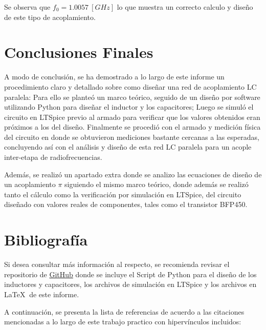 \documentclass[conference]{IEEEtran}
\begin{document}
Se observa que $f_{0} = 1.0057 \ [GHz]$ lo que muestra un correcto calculo y diseño de este tipo de acoplamiento.



\section{Conclusiones Finales}
A modo de conclusión, se ha demostrado a lo largo de este informe un procedimiento claro y detallado sobre como diseñar una red de acoplamiento LC paralela: Para ello se planteó un marco teórico, seguido de un diseño por software utilizando Python para diseñar el inductor y los capacitores; Luego se simuló el circuito en LTSpice previo al armado para verificar que los valores obtenidos eran próximos a los del diseño. Finalmente se procedió con el armado y medición física del circuito en donde se obtuvieron mediciones bastante cercanas a las esperadas, concluyendo así con el análisis y diseño de esta red LC paralela para un acople inter-etapa de radiofrecuencias.

Además, se realizó un apartado extra donde se analizo las ecuaciones de diseño de un acoplamiento $\pi$ siguiendo el mismo marco teórico, donde además se realizó tanto el cálculo como la verificación por simulación en LTSpice, del circuito diseñado con valores reales de componentes, tales como el transistor BFP450.



\section{Bibliografía}
Si desea consultar más información al respecto, se recomienda revisar el repositorio de \href{https://github.com/ErnestMonja/Electronica_Analogica_III/tree/main/Trabajo%20Pr%C3%A1ctico%20N%C2%B01%20-%20Circuitos%20Sintonizados}{GitHub} donde se incluye el Script de Python para el diseño de los inductores y capacitores, los archivos de simulación en LTSpice y los archivos en \LaTeX $\ $ de este informe.

A continuación, se presenta la lista de referencias de acuerdo a las citaciones mencionadas a lo largo de este trabajo practico con hipervínculos incluidos:
\end{document}
